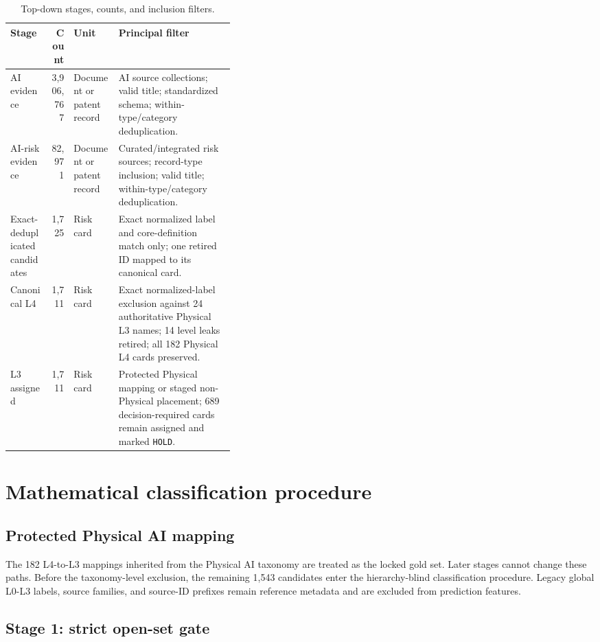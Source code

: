 \documentclass[11pt,a4paper]{article}
\newcommand{\code}[1]{\texttt{#1}}
\begin{document}
\begin{table}[H]
\centering
\caption{Top-down stages, counts, and inclusion filters.}
\label{tab:funnel}
\small
\begin{tabularx}{\linewidth}{L{0.18\linewidth}r L{0.20\linewidth}Y}
\toprule
Stage & Count & Unit & Principal filter \\
\midrule
AI evidence & 3,906,767 & Document or patent record & AI source collections; valid title; standardized schema; within-type/category deduplication. \\
AI-risk evidence & 82,971 & Document or patent record & Curated/integrated risk sources; record-type inclusion; valid title; within-type/category deduplication. \\
Exact-deduplicated candidates & 1,725 & Risk card & Exact normalized label and core-definition match only; one retired ID mapped to its canonical card. \\
Canonical L4 & 1,711 & Risk card & Exact normalized-label exclusion against 24 authoritative Physical L3 names; 14 level leaks retired; all 182 Physical L4 cards preserved. \\
L3 assigned & 1,711 & Risk card & Protected Physical mapping or staged non-Physical placement; 689 decision-required cards remain assigned and marked \code{HOLD}. \\
\bottomrule
\end{tabularx}
\end{table}

\section{Mathematical classification procedure}

\subsection{Protected Physical AI mapping}

The 182 L4-to-L3 mappings inherited from the Physical AI taxonomy are treated
as the locked gold set. Later stages cannot change these paths. Before the
taxonomy-level exclusion, the remaining 1,543 candidates enter the
hierarchy-blind classification procedure. Legacy global
L0-L3 labels, source families, and source-ID prefixes remain reference metadata
and are excluded from prediction features.

\subsection{Stage 1: strict open-set gate}
\end{document}
